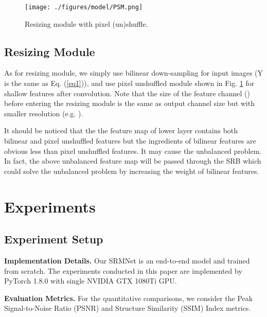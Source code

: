 \documentclass{article}
\begin{document}
\begin{figure}[htbp] 
	\centering
	\texttt{[image: ./figures/model/PSM.png]}
  \caption{Resizing module with pixel (un)shuffle.}
  \label{PSM}
\end{figure}

\subsection{Resizing Module}
As for resizing module, we simply use bilinear down-sampling for input images  (Y is the same as Eq. (\ref{eq1})), and use pixel unshuffled module shown in Fig. \ref{PSM} for shallow features after  convolution. Note that the size of the feature channel () before entering the resizing module is the same as output channel size but with smaller resolution (e.g. ). 

It should be noticed that the the feature map of lower layer contains both bilinear and pixel unshuffled features but the ingredients of bilinear features are obvious less than pixel unshuffled features. It may cause the unbalanced problem. In fact, the above unbalanced feature map will be passed through the SRB which could solve the unbalanced problem by increasing the weight of bilinear features. 

\section{Experiments}

\subsection{Experiment Setup}
\noindent\textbf{Implementation Details.} Our SRMNet is an end-to-end model and trained from scratch. The experiments conducted in this paper are implemented by PyTorch 1.8.0 with single NVIDIA GTX 1080Ti GPU.

\noindent\textbf{Evaluation Metrics.} For the quantitative comparisons, we consider the Peak Signal-to-Noise Ratio (PSNR) and Structure Similarity (SSIM) Index metrics.
\end{document}
